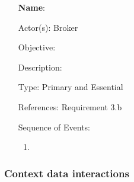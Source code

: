 \begin{itemize}
	\item[\textbf{Name}:] 
	\item[Actor(s):] Broker
	\item[Objective:]  
	\item[Description:]  
	\item[Type:] Primary and Essential
	\item[References:] Requirement 3.b 
	\item[Sequence of Events:]\hfill
	\begin{enumerate}
		\item 
	\end{enumerate}
\end{itemize}

\subsubsection{Context data interactions}
